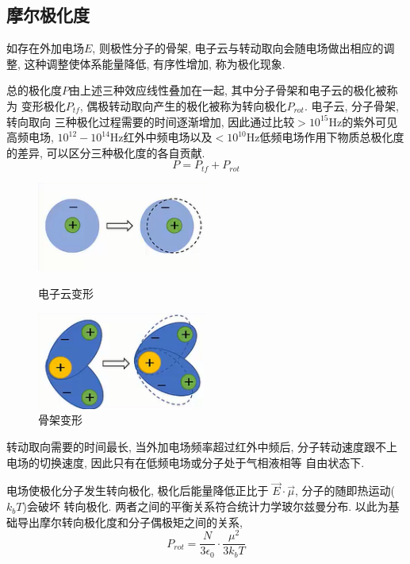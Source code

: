 \documentclass[a4paper]{article}
\begin{document}
\subsection{摩尔极化度}
如存在外加电场$E$, 则极性分子的骨架, 电子云与转动取向会随电场做出相应的调整, 
这种调整使体系能量降低, 有序性增加, 称为极化现象.
\par
总的极化度$P$由上述三种效应线性叠加在一起, 其中分子骨架和电子云的极化被称为
变形极化$P_{tf}$, 偶极转动取向产生的极化被称为转向极化$P_{rot}$. 电子云, 分子骨架, 转向取向
三种极化过程需要的时间逐渐增加, 因此通过比较$> 10^{15}$Hz的紫外可见高频电场, 
$10^{12}-10^{14}$Hz红外中频电场以及$< 10^{10}$Hz低频电场作用下物质总极化度
的差异, 可以区分三种极化度的各自贡献.
\begin{equation}
	P = P_{tf}+P_{rot}
\end{equation}
\begin{figure}[H]
	\begin{minipage}[t]{0.5\linewidth}
		\centering
		\includegraphics[width=2.2in]{fig/electron_disform.png}
		\caption{电子云变形}
		\label{fig:side:a}
	\end{minipage}
	\begin{minipage}[t]{0.5\linewidth}
		\centering
		\includegraphics[width=2.2in]{fig/frame_disform.png}
		\caption{骨架变形}
		\label{fig:side:b}
	\end{minipage}
\end{figure}
转动取向需要的时间最长, 当外加电场频率超过红外中频后, 
分子转动速度跟不上电场的切换速度, 因此只有在低频电场或分子处于气相液相等
自由状态下.
\par
电场使极化分子发生转向极化, 极化后能量降低正比于
$\vec{E}\cdot \vec{\mu}$, 分子的随即热运动($k_{b}T$)会破坏
转向极化. 两者之间的平衡关系符合统计力学玻尔兹曼分布. 
以此为基础导出摩尔转向极化度和分子偶极矩之间的关系, 
\begin{equation}
	P_{rot} = \frac{N}{3\epsilon_{0}}\cdot \frac{\mu^{2}}{3k_{b}T}
\end{equation}
\end{document}

